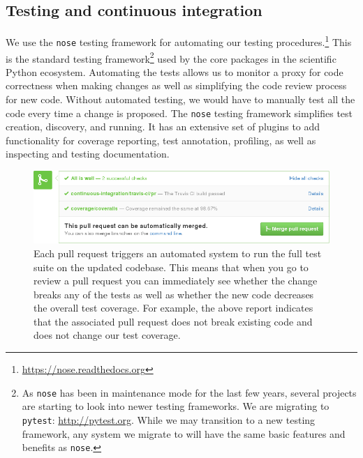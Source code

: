 \documentclass[]{article}
\begin{document}
\subsection{\label{sec:test}Testing and continuous integration}

We use the \texttt{nose} testing framework for automating our testing
procedures.\footnote{\url{https://nose.readthedocs.org}}
This is the standard testing framework\footnote{As \texttt{nose} has been in
maintenance mode for the last few years, several projects are starting to look
into newer testing frameworks.
We are migrating to \texttt{pytest}: \url{http://pytest.org}.
While we may transition to a new testing framework, any system we
migrate to will have the same basic features and benefits as \texttt{nose}.}
used by the core packages in the scientific Python ecosystem.
Automating the tests allows us to monitor a proxy for code correctness when
making changes as well as simplifying the code review process for new code.
Without automated testing, we would have to manually test all the code every
time a change is proposed.
The \texttt{nose} testing framework simplifies test creation, discovery, and
running.
It has an extensive set of plugins to add functionality for coverage reporting,
test annotation, profiling, as well as inspecting and testing documentation.

\begin{figure}
  \begin{centering}
    \includegraphics[width=\textwidth]{fig/pull-request-ci.png}\par
  \end{centering}

  \caption{\label{fig:pull-request}
  \small
    Each pull request triggers an automated system to run the  full test suite on
    the updated codebase.
    This means that when you go to review a pull request you can immediately see
    whether the change breaks any of the tests as well as whether the new
    code decreases the overall test coverage.
    For example, the above report indicates that the associated pull request does not
    break existing code and does not change our test coverage.}
\end{figure}
\end{document}
